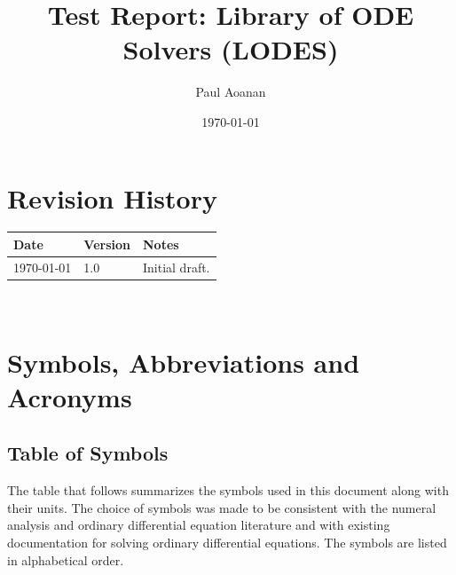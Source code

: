 \documentclass[12pt, titlepage]{article}
\newcommand{\famname}{LODES} %
\newcommand{\famdesc}{Library of ODE Solvers}
\begin{document}
\title{Test Report: \famdesc{} (\famname{})} 
\author{Paul Aoanan}
\date{\today}
	
\maketitle


\section{Revision History}

\begin{tabularx}{\textwidth}{p{3cm}p{2cm}X}
\toprule {\bf Date} & {\bf Version} & {\bf Notes}\\
\midrule
\today & 1.0 & Initial draft.\\
\bottomrule
\end{tabularx}

~\newpage

\section{Symbols, Abbreviations and Acronyms}

\subsection{Table of Symbols}

The table that follows summarizes the symbols used in this document along with
their units.  The choice of symbols was made to be consistent with the numeral analysis
and ordinary differential equation literature and with existing documentation
for solving ordinary differential equations.  The symbols are listed in alphabetical order.
\end{document}
